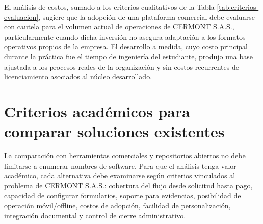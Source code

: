 El análisis de costos, sumado a los criterios cualitativos de la Tabla \ref{tab:criterios-evaluacion}, sugiere que la adopción de una plataforma comercial debe evaluarse con cautela para el volumen actual de operaciones de CERMONT S.A.S., particularmente cuando dicha inversión no asegura adaptación a los formatos operativos propios de la empresa. El desarrollo a medida, cuyo costo principal durante la práctica fue el tiempo de ingeniería del estudiante, produjo una base ajustada a los procesos reales de la organización y sin costos recurrentes de licenciamiento asociados al núcleo desarrollado.

\section{Criterios académicos para comparar soluciones existentes}
\label{sec:criterios-comparacion-soluciones}

La comparación con herramientas comerciales y repositorios abiertos no debe limitarse a enumerar nombres de software. Para que el análisis tenga valor académico, cada alternativa debe examinarse según criterios vinculados al problema de CERMONT S.A.S.: cobertura del flujo desde solicitud hasta pago, capacidad de configurar formularios, soporte para evidencias, posibilidad de operación móvil/offline, costos de adopción, facilidad de personalización, integración documental y control de cierre administrativo.

